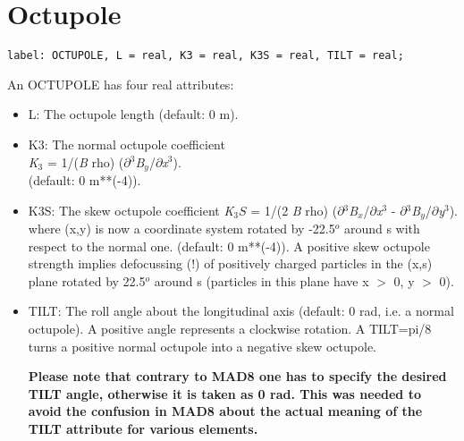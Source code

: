 
\section{Octupole}
\label{sec:octupole}

\begin{verbatim}
label: OCTUPOLE, L = real, K3 = real, K3S = real, TILT = real;
\end{verbatim} 

An OCTUPOLE has four real attributes: 
\begin{itemize}
   \item L: The octupole length (default: 0 m). 

   \item K3: The normal octupole coefficient \\
     \textit{K}$_3$ = 1/(\textit{B} rho)
     ($\partial$$^3$\textit{B$_y$}/$\partial$\textit{x}$^3$). \\ 
     (default: 0 m**(-4)). 

   \item K3S: The skew octupole coefficient 
     \textit{K}$_3S$ = 1/(2 \textit{B} rho)
     ($\partial$$^3$\textit{B$_x$}/$\partial$\textit{x}$^3$ -
     $\partial$$^3$\textit{B$_y$}/$\partial$\textit{y}$^3$). \\
     where (x,y) is now a coordinate system rotated by -22.5$^o$ around
     s with respect to the normal one. (default: 0 m**(-4)). A positive
     skew octupole strength implies defocussing (!) of positively
     charged particles in the (x,s) plane rotated by 22.5$^o$ around s
     (particles in this plane have x $>$ 0, y $>$ 0).  

   \item TILT: The roll angle about the longitudinal axis (default: 0
     rad, i.e. a normal octupole). A positive angle represents a
     clockwise rotation. A TILT=pi/8 turns a positive normal octupole
     into a negative skew octupole.  

     \textbf{  Please note that contrary to MAD8 one has to specify the
       desired TILT angle, otherwise it is taken as 0 rad. This was
       needed to avoid the confusion in MAD8 about the actual meaning of
       the TILT attribute for various elements. }

\end{itemize}

